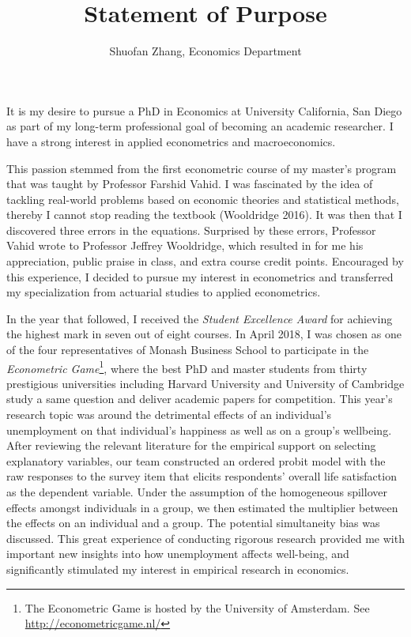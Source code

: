 \documentclass[12pt,]{article}
\title{Statement of Purpose}
\author{Shuofan Zhang, Economics Department}
\date{}
\let\rmarkdownfootnote\footnote%
\def\footnote{\protect\rmarkdownfootnote}
\begin{document}
\maketitle


It is my desire to pursue a PhD in Economics at University California,
San Diego as part of my long-term professional goal of becoming an
academic researcher. I have a strong interest in applied econometrics
and macroeconomics.

This passion stemmed from the first econometric course of my master's
program that was taught by Professor Farshid Vahid. I was fascinated by
the idea of tackling real-world problems based on economic theories and
statistical methods, thereby I cannot stop reading the textbook
(Wooldridge 2016). It was then that I discovered three errors in the
equations. Surprised by these errors, Professor Vahid wrote to Professor
Jeffrey Wooldridge, which resulted in for me his appreciation, public
praise in class, and extra course credit points. Encouraged by this
experience, I decided to pursue my interest in econometrics and
transferred my specialization from actuarial studies to applied
econometrics.

In the year that followed, I received the \emph{Student Excellence
Award} for achieving the highest mark in seven out of eight courses. In
April 2018, I was chosen as one of the four representatives of Monash
Business School to participate in the \emph{Econometric Game}\footnote{The
  Econometric Game is hosted by the University of Amsterdam. See
  \url{http://econometricgame.nl/}}, where the best PhD and master
students from thirty prestigious universities including Harvard
University and University of Cambridge study a same question and deliver
academic papers for competition. This year's research topic was around
the detrimental effects of an individual's unemployment on that
individual's happiness as well as on a group's wellbeing. After
reviewing the relevant literature for the empirical support on selecting
explanatory variables, our team constructed an ordered probit model with
the raw responses to the survey item that elicits respondents' overall
life satisfaction as the dependent variable. Under the assumption of the
homogeneous spillover effects amongst individuals in a group, we then
estimated the multiplier between the effects on an individual and a
group. The potential simultaneity bias was discussed. This great
experience of conducting rigorous research provided me with important
new insights into how unemployment affects well-being, and significantly
stimulated my interest in empirical research in economics.
\end{document}
